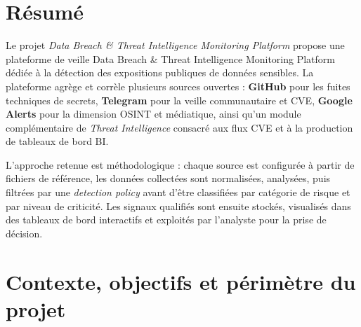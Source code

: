 \documentclass[12pt,a4paper]{report}
\newcommand{\projetnom}{Data Breach \& Threat Intelligence Monitoring Platform}
\newcommand{\platformename}{plateforme de veille \projetnom{}}
\begin{document}
\begin{titlepage}
\end{titlepage}





\chapter*{Résumé}

Le projet \textit{\projetnom{}} propose une \platformename{} dédiée à la détection des expositions publiques de données sensibles. La plateforme agrège et corrèle plusieurs sources ouvertes : \textbf{GitHub} pour les fuites techniques de secrets, \textbf{Telegram} pour la veille communautaire et CVE, \textbf{Google Alerts} pour la dimension OSINT et médiatique, ainsi qu'un module complémentaire de \textit{Threat Intelligence} consacré aux flux CVE et à la production de tableaux de bord BI.

L'approche retenue est méthodologique : chaque source est configurée à partir de fichiers de référence, les données collectées sont normalisées, analysées, puis filtrées par une \textit{detection policy} avant d'être classifiées par catégorie de risque et par niveau de criticité. Les signaux qualifiés sont ensuite stockés, visualisés dans des tableaux de bord interactifs et exploités par l'analyste pour la prise de décision.


\tableofcontents
\thispagestyle{fancy}


\chapter{Contexte, objectifs et périmètre du projet}
\end{document}
